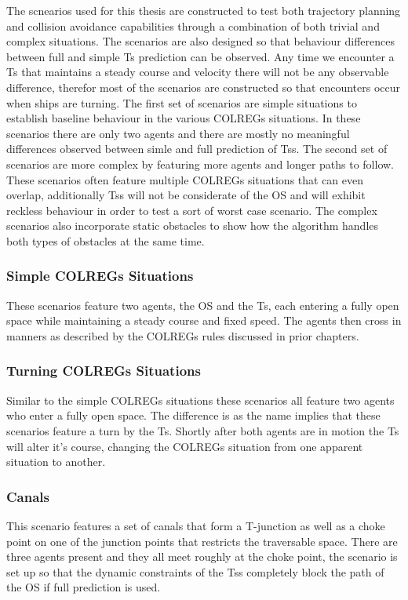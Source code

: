 The scnearios used for this thesis are constructed to test both trajectory planning and collision avoidance capabilities through
a combination of both trivial and complex situations. The scenarios are also designed so that behaviour differences between
full and simple \gls{Ts} prediction can be observed. Any time we encounter a \gls{Ts} that maintains a steady course and
velocity there will not be any observable difference, therefor most of the scenarios are constructed so that encounters occur
when ships are turning.
The first set of scenarios are simple situations to establish baseline behaviour in the various \gls{COLREGs} situations. In these scenarios there are only 
two agents and there are mostly no meaningful differences observed between simle and full prediction of \gls{Ts}s. 
The second set of scenarios are more complex by featuring more agents and longer paths to follow. These scenarios often feature multiple \gls{COLREGs} situations that can
even overlap, additionally \gls{Ts}s will not be considerate of the \gls{OS} and will exhibit reckless behaviour in order to test a sort of worst case scenario.
The complex scenarios also incorporate static obstacles to show how the algorithm handles both types of obstacles at the same time.

\subsubsection*{Simple COLREGs Situations}
These scenarios feature two agents, the \gls{OS} and the \gls{Ts}, each entering a fully open space while maintaining a
steady course and fixed speed. The agents then cross in manners as described by the \gls{COLREGs} rules discussed in prior chapters.


\subsubsection*{Turning COLREGs Situations}
Similar to the simple \gls{COLREGs} situations these scenarios all feature two agents who enter a fully open space. The difference
is as the name implies that these scenarios feature a turn by the \gls{Ts}. Shortly after both agents are in motion the \gls{Ts}
will alter it's course, changing the COLREGs situation from one apparent situation to another.

\subsubsection*{Canals}
This scenario features a set of canals that form a T-junction as well as a choke point on one of the junction points that restricts
the traversable space. There are three agents present and they all meet roughly at the choke point, the scenario is set up so that
the dynamic constraints of the \gls{Ts}s completely block the path of the \gls{OS} if full prediction is used.

